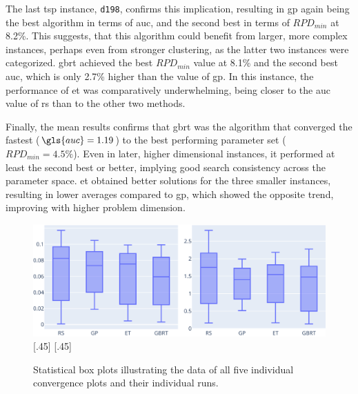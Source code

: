 The last \gls{tsp} instance, \texttt{d198}, confirms this implication, resulting in \gls{gp} again being the best algorithm in terms of \gls{auc}, and the second best in terms of $RPD_{min}$ at 8.2\%. This suggests, that this algorithm could benefit from larger, more complex instances, perhaps even from stronger clustering, as the latter two instances were categorized. \gls{gbrt} achieved the best $RPD_{min}$ value at 8.1\% and the second best \gls{auc}, which is only 2.7\% higher than the value of \gls{gp}. In this instance, the performance of \gls{et} was comparatively underwhelming, being closer to the \gls{auc} value of \gls{rs} than to the other two methods.

Finally, the mean results confirms that \gls{gbrt} was the algorithm that converged the fastest ($\gls{auc} = 1.19$) to the best performing parameter set ($RPD_{min} = 4.5\%$). Even in later, higher dimensional  instances, it performed at least the second best or better, implying good search consistency across the parameter space. \gls{et} obtained better solutions for the three smaller instances, resulting in lower averages compared to \gls{gp}, which showed the opposite trend, improving with higher problem dimension.

\begin{figure}[h]
	\centering
	\includegraphics[width=\textwidth]{results/part1/convergence_stats_boxplot.svg}
\captionsetup[subfigure]
{skip=-8pt}
		\hfill
		[.45\linewidth]{\hfill}
		\hfill
		[.45\linewidth]{\hfill}

	\caption[Statistical box plots illustrating convergence plots]{Statistical box plots illustrating the data of all five individual convergence plots and their individual runs.}
\label{fig:convergence_stats_boxplots}
\end{figure}

